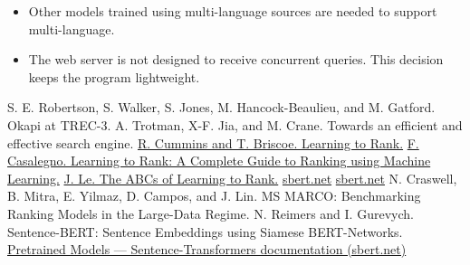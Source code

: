 \documentclass[11pt]{article}
\begin{document}
\begin{itemize}
\item
  Other models trained using multi-language sources are needed to
  support multi-language.
\item
  The web server is not designed to receive concurrent queries. This
  decision keeps the program lightweight.
\end{itemize}

\begin{thebibliography}{99}

S. E. Robertson, S. Walker, S. Jones, M. Hancock-Beaulieu, and M. Gatford. Okapi at TREC-3.
A. Trotman, X-F. Jia, and M. Crane. Towards an efficient and effective search engine.
\href{https://www.cl.cam.ac.uk/teaching/1516/R222/l2r-overview.pdf}{R. Cummins and T. Briscoe. Learning to Rank.}
\href{https://miro.medium.com/v2/resize:fit:1400/format:webp/1*s3CQuNRWcQNkQKd8Met-MA.png}{F. Casalegno. Learning to Rank: A Complete Guide to Ranking using Machine Learning.}
\href{https://lucidworks.com/wp-content/uploads/2019/11/list_wise_lucidworks.png}{J. Le. The ABCs of Learning to Rank.}
\href{https://raw.githubusercontent.com/UKPLab/sentence-transformers/master/docs/img/InformationRetrieval.png}{sbert.net}
\href{https://raw.githubusercontent.com/UKPLab/sentence-transformers/master/docs/img/SemanticSearch.png}{sbert.net}
N. Craswell, B. Mitra, E. Yilmaz, D. Campos, and J. Lin. MS MARCO: Benchmarking Ranking Models in the Large-Data Regime.
N. Reimers and I. Gurevych. Sentence-BERT: Sentence Embeddings using Siamese BERT-Networks.
\href{https://www.sbert.net/docs/pretrained_models.html}{Pretrained Models --- Sentence-Transformers documentation (sbert.net)}

\end{thebibliography}
\end{document}
